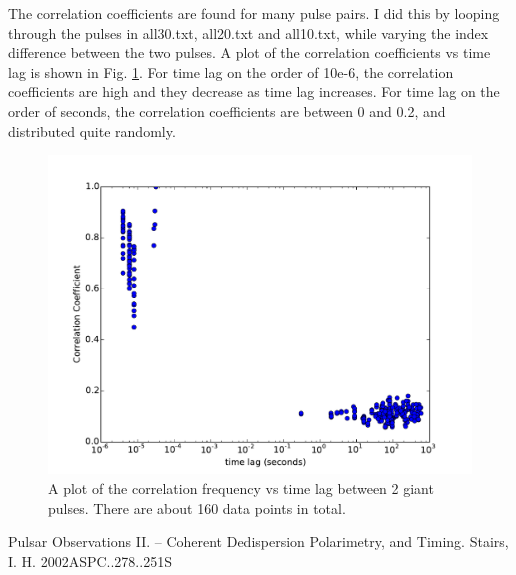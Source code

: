 \documentclass[apj]{emulateapj}
\begin{document}
The correlation coefficients are found for many pulse pairs. I did this by looping through the pulses in all30.txt, all20.txt and all10.txt, while varying the index difference between the two pulses. A plot of the correlation coefficients vs time lag is shown in Fig. \ref{fig:coeffs}. For time lag on the order of 10e-6, the correlation coefficients are high and they decrease as time lag increases. For time lag on the order of seconds, the correlation coefficients are between 0 and 0.2, and distributed quite randomly.


\begin{figure}[H]
\includegraphics[width=1.0\columnwidth]{May12_coeff.pdf}
\caption{A plot of the correlation frequency vs time lag between 2 giant pulses. There are about 160 data points in total.}
\label{fig:coeffs}
\end{figure}







\begin{thebibliography}{lenscib_refs.bib,apj-jour}
Pulsar Observations II. -- Coherent Dedispersion Polarimetry, and Timing.
Stairs, I. H. 2002ASPC..278..251S
\end{thebibliography}
\end{document}
